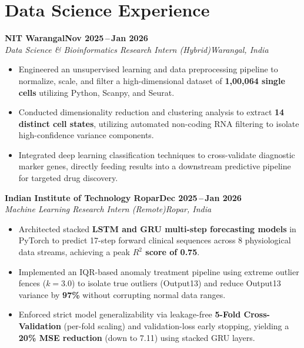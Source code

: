\documentclass[9.5pt,a4paper]{article}
\newcommand{\entry}[4]{%
  \vspace{1.5pt}\noindent\textbf{#1}\hfill\textbf{\small#2}\\[-3.5pt]
  \textit{\small#3}\hfill\textit{\small#4}\vspace{0.2pt}%
}
\begin{document}
\section{Data Science Experience}

\entry{NIT Warangal}{Nov 2025\,--\,Jan 2026}
      {Data Science \& Bioinformatics Research Intern (Hybrid)}{Warangal, India}
\begin{itemize}
  \item Engineered an unsupervised learning and data preprocessing pipeline to normalize, scale, and filter a high-dimensional dataset of \textbf{1,00,064 single cells} utilizing Python, Scanpy, and Seurat.
  \item Conducted dimensionality reduction and clustering analysis to extract \textbf{14 distinct cell states}, utilizing automated non-coding RNA filtering to isolate high-confidence variance components.
  \item Integrated deep learning classification techniques to cross-validate diagnostic marker genes, directly feeding results into a downstream predictive pipeline for targeted drug discovery.
\end{itemize}

\entry{Indian Institute of Technology Ropar}{Dec 2025\,--\,Jan 2026}
      {Machine Learning Research Intern (Remote)}{Ropar, India}
\begin{itemize}
  \item Architected stacked \textbf{LSTM and GRU multi-step forecasting models} in PyTorch to predict 17-step forward clinical sequences across 8 physiological data streams, achieving a peak \textbf{$R^2$ score of 0.75}.
  \item Implemented an IQR-based anomaly treatment pipeline using extreme outlier fences ($k=3.0$) to isolate true outliers (Output13) and reduce Output13 variance by \textbf{97\%} without corrupting normal data ranges.
  \item Enforced strict model generalizability via leakage-free \textbf{5-Fold Cross-Validation} (per-fold scaling) and validation-loss early stopping, yielding a \textbf{20\% MSE reduction} (down to 7.11) using stacked GRU layers.
\end{itemize}

\end{document}
